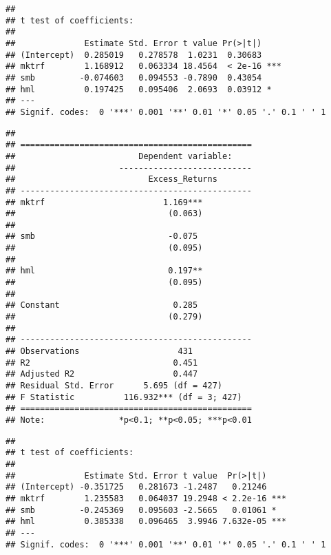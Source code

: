 \documentclass[
]{article}
\begin{document}
\begin{verbatim}
## 
## t test of coefficients:
## 
##              Estimate Std. Error t value Pr(>|t|)    
## (Intercept)  0.285019   0.278578  1.0231  0.30683    
## mktrf        1.168912   0.063334 18.4564  < 2e-16 ***
## smb         -0.074603   0.094553 -0.7890  0.43054    
## hml          0.197425   0.095406  2.0693  0.03912 *  
## ---
## Signif. codes:  0 '***' 0.001 '**' 0.01 '*' 0.05 '.' 0.1 ' ' 1
\end{verbatim}

\begin{verbatim}
## 
## ===============================================
##                         Dependent variable:    
##                     ---------------------------
##                           Excess_Returns       
## -----------------------------------------------
## mktrf                        1.169***          
##                               (0.063)          
##                                                
## smb                           -0.075           
##                               (0.095)          
##                                                
## hml                           0.197**          
##                               (0.095)          
##                                                
## Constant                       0.285           
##                               (0.279)          
##                                                
## -----------------------------------------------
## Observations                    431            
## R2                             0.451           
## Adjusted R2                    0.447           
## Residual Std. Error      5.695 (df = 427)      
## F Statistic          116.932*** (df = 3; 427)  
## ===============================================
## Note:               *p<0.1; **p<0.05; ***p<0.01
\end{verbatim}

\begin{verbatim}
## 
## t test of coefficients:
## 
##              Estimate Std. Error t value  Pr(>|t|)    
## (Intercept) -0.351725   0.281673 -1.2487   0.21246    
## mktrf        1.235583   0.064037 19.2948 < 2.2e-16 ***
## smb         -0.245369   0.095603 -2.5665   0.01061 *  
## hml          0.385338   0.096465  3.9946 7.632e-05 ***
## ---
## Signif. codes:  0 '***' 0.001 '**' 0.01 '*' 0.05 '.' 0.1 ' ' 1
\end{verbatim}
\end{document}
